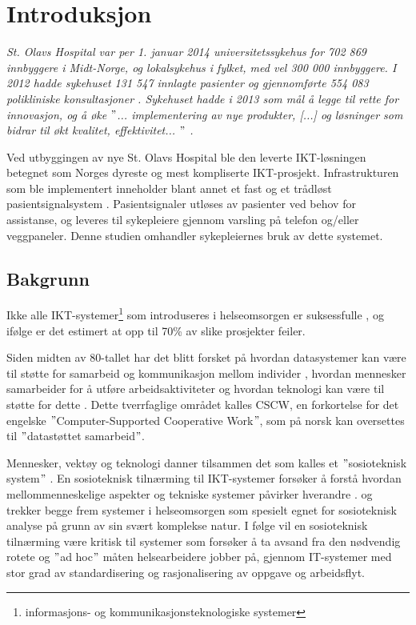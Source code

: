 \chapter{Introduksjon}
\label{chp:introduksjon}
\textit{St. Olavs Hospital var per 1. januar 2014 universitetssykehus for 702 869 innbyggere i Midt-Norge, og lokalsykehus i fylket, med vel 300 000 innbyggere. I 2012 hadde sykehuset 131 547 innlagte pasienter og gjennomførte 554 083 polikliniske konsultasjoner \citep{stolavs}. Sykehuset hadde i 2013 som mål å legge til rette for innovasjon, og å øke $"$... implementering av nye produkter, [...] og løsninger som bidrar til økt kvalitet, effektivitet... $"$ \citep{styring13}.}

\noindent
Ved utbyggingen av nye St. Olavs Hospital ble den leverte IKT-løsningen betegnet som Norges dyreste og mest kompliserte IKT-prosjekt. Infrastrukturen som ble implementert inneholder blant annet et fast og et trådløst pasientsignalsystem \citep{TU}. Pasientsignaler utløses av pasienter ved behov for assistanse, og leveres til sykepleiere gjennom varsling på telefon og/eller veggpaneler. Denne studien omhandler sykepleiernes bruk av dette systemet.

\section{Bakgrunn}
Ikke alle IKT-systemer\footnote{informasjons- og kommunikasjonsteknologiske systemer} som introduseres i helseomsorgen er suksessfulle \citep{Coiera07}, og ifølge \citet{FITT} er det estimert at opp til 70\% av slike prosjekter feiler.

\noindent
Siden midten av 80-tallet har det blitt forsket på hvordan datasystemer kan være til støtte for samarbeid og kommunikasjon mellom individer \citep{Rogers94}, hvordan mennesker samarbeider for å utføre arbeidsaktiviteter og hvordan teknologi kan være til støtte for dette \citep{Ellis91}. Dette tverrfaglige området kalles CSCW, en forkortelse for det engelske $"$Computer-Supported Cooperative Work$"$, som på norsk kan oversettes til $"$datastøttet samarbeid$"$. 

\noindent
Mennesker, vektøy og teknologi danner tilsammen det som kalles et $"$sosioteknisk system$"$ \citep{Coiera04}. En sosioteknisk tilnærming til IKT-systemer forsøker å forstå hvordan mellommenneskelige aspekter og tekniske systemer påvirker hverandre \citep{Coiera04}. \citet{Coiera07} og \citet{Berg99} trekker begge frem systemer i helseomsorgen som spesielt egnet for sosioteknisk analyse på grunn av sin svært komplekse natur. I følge \citet{Berg99} vil en sosioteknisk tilnærming være kritisk til systemer som forsøker å ta avsand fra den nødvendig rotete og $"$ad hoc$"$ måten helsearbeidere jobber på, gjennom IT-systemer med stor grad av standardisering og rasjonalisering av oppgave og arbeidsflyt.

